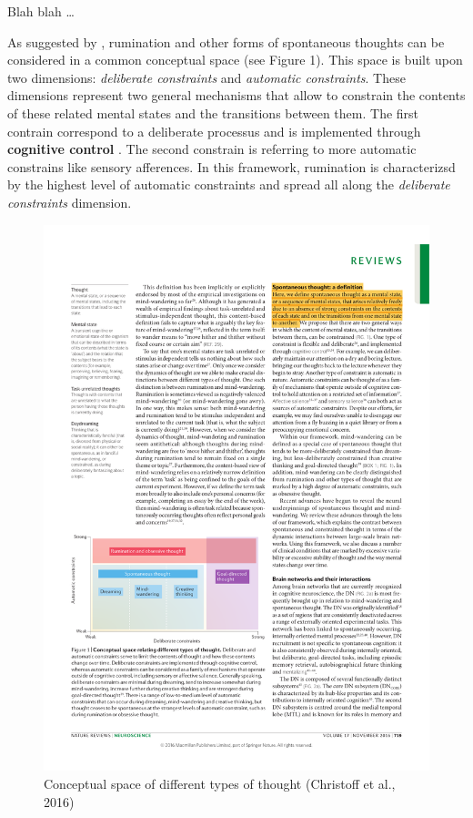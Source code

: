 \documentclass[a4paper,11pt,oneside,oldfontcommands]{memoir}
\begin{document}
Blah blah \citep{koster_rumination_2013}\ldots{}

As suggested by \citet{Christoff2016}, rumination and other forms of
spontaneous thoughts can be considered in a common conceptual space (see
Figure 1). This space is built upon two dimensions: \emph{deliberate
constraints} and \emph{automatic constraints}. These dimensions
represent two general mechanisms that allow to constrain the contents of
these related mental states and the transitions between them. The first
contrain correspond to a deliberate processus and is implemented through
\textbf{cognitive control} \citep{Miller2000}. The second constrain is
referring to more automatic constrains like sensory afferences. In this
framework, rumination is characterizsd by the highest level of automatic
constraints and spread all along the \emph{deliberate constraints}
dimension.

\begin{figure}

{\centering \includegraphics[width=0.75\linewidth]{assets/conceptual_space} 

}

\caption{Conceptual space of different types of thought (Christoff et al., 2016)}\label{fig:conceptual}
\end{figure}
\end{document}
